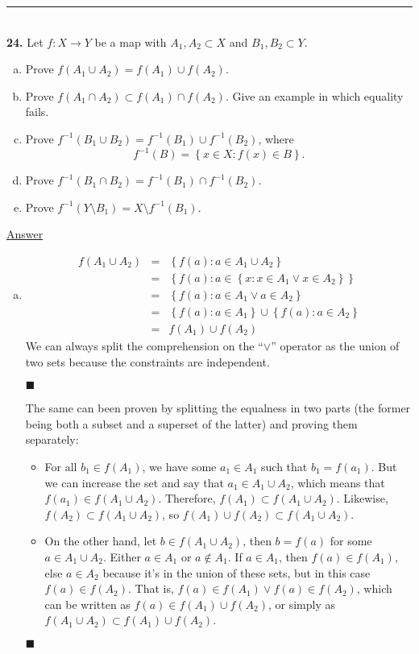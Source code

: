 \documentclass{article}[10pt]
\newenvironment{exercise}[1]
    {\noindent\rule{2cm}{0.4pt} \\
     \textbf{#1.}}
    {}
\newcommand{\answer}{

  \underline{Answer}

}
\newcommand{\qed}{

\hfill\ensuremath{\blacksquare}

}
\begin{document}
\begin{exercise}{24}
  Let $f : X \to Y$ be a map
  with $A_1, A_2 \subset X$ and $B_1, B_2 \subset Y$.
  \begin{enumerate}[(a)]
    \item Prove $f(A_1 \cup A_2) = f(A_1) \cup f(A_2)$.
    \item Prove $f(A_1 \cap A_2) \subset f(A_1) \cap f(A_2)$.
          Give an example in which equality fails.
    \item Prove $f^{-1}(B_1 \cup B_2) = f^{-1}(B_1) \cup f^{-1}(B_2)$,
          where \[f^{-1}(B) = \left\{ x \in X : f(x) \in B \right\}.\]
    \item Prove $f^{-1}(B_1 \cap B_2) = f^{-1}(B_1) \cap f^{-1}(B_2)$.
    \item Prove $f^{-1}(Y \setminus B_1) = X \setminus f^{-1}(B_1)$.
  \end{enumerate}
  \answer
  \begin{enumerate}[(a)]

    \item
      \[\begin{array}{rcl}
        f(A_1 \cup A_2)
        &=& \left\{ f(a) : a \in A_1 \cup A_2 \right\} \\
        &=& \left\{ f(a) : a \in \left\{ x : x \in A_1 \lor x \in A_2
                                 \right\}
            \right\} \\
        &=& \left\{ f(a) : a \in A_1 \lor a \in A_2 \right\} \\
        &=& \left\{ f(a) : a \in A_1 \right\} \cup
            \left\{ f(a) : a \in A_2 \right\} \\
        &=& f(A_1) \cup f(A_2)
      \end{array}\]
      We can always split the comprehension
      on the ``$\lor$'' operator
      as the union of two sets
      because the constraints are independent.
      \qed
      The same can been proven
      by splitting the equalness in two parts
      (the former being both a subset and a superset of the latter)
      and proving them separately:
      \begin{itemize}
        \item
          For all $b_1 \in f(A_1)$,
          we have some $a_1 \in A_1$
          such that $b_1 = f(a_1)$.
          But we can increase the set
          and say that $a_1 \in A_1 \cup A_2$,
          which means that $f(a_1) \in f(A_1 \cup A_2)$.
          Therefore, $f(A_1) \subset f(A_1 \cup A_2)$.
          Likewise, $f(A_2) \subset f(A_1 \cup A_2)$,
          so $f(A_1) \cup f(A_2) \subset f(A_1 \cup A_2)$.
        \item
          On the other hand, let $b \in f(A_1 \cup A_2)$,
          then $b = f(a)$ for some $a \in A_1 \cup A_2$.
          Either $a \in A_1$ or $a \notin A_1$.
          If $a \in A_1$, then $f(a) \in f(A_1)$,
          else $a \in A_2$ because it's in the union of these sets,
          but in this case $f(a) \in f(A_2)$.
          That is, $f(a) \in f(A_1) \lor f(a) \in f(A_2)$,
          which can be written as $f(a) \in f(A_1) \cup f(A_2)$,
          or simply as $f(A_1 \cup A_2) \subset f(A_1) \cup f(A_2)$.
      \end{itemize}
      \qed


\end{enumerate}
\end{exercise}
\end{document}
